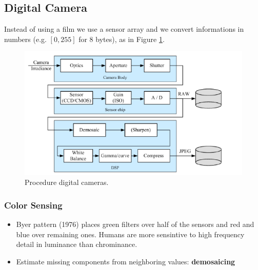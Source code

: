 \documentclass[a4paper,12 pt]{article}
\theoremstyle{definition}
\theoremstyle{remark}
\theoremstyle{definition}
\theoremstyle{definition}
\theoremstyle{definition}
\theoremstyle{remark}
\theoremstyle{definition}
\begin{document}
\subsection*{Digital Camera}
Instead of using a film we use a sensor array and we convert informations in numbers (e.g. $[0,255]$ for 8 bytes), as in Figure \ref{fig:procedure_one}.
\begin{figure}[h!]
\begin{center}
\includegraphics[scale=0.5]{pics/procedure}
\caption{Procedure digital cameras. \label{fig:procedure_one}}
\end{center}
\end{figure}
\subsubsection*{Color Sensing}
\begin{itemize}
\item Byer pattern (1976) places green filters over half of the sensors and red and blue over remaining ones. Humans are more sensintive to high frequency detail in luminance than chrominance.
\item Estimate missing components from neighboring values: \textbf{demosaicing}
\end{itemize}
\end{document}
